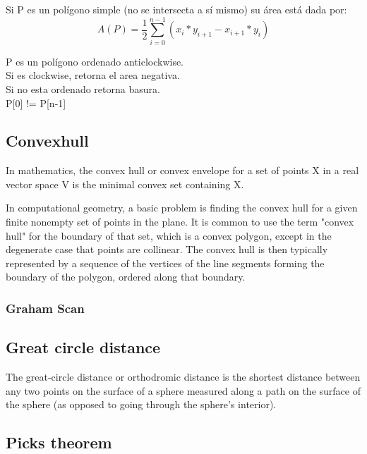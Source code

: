\documentclass[10pt,letterpaper,twocolumn,twosided]{article}
\newcommand{\codigofuente}[1]{

\dotfill
}
\begin{document}
Si P es un polígono simple (no se intersecta a sí mismo) su área está dada
por:\\

$$ A(P) = \frac{1}{2} \sum_{i=0}^{n-1} (x_i*y_{i+1}-x_{i+1}*y_i)$$

P es un polígono ordenado anticlockwise.\\
Si es clockwise, retorna el area negativa.\\ 
Si no esta ordenado retorna basura.\\
P[0] != P[n-1]

\codigofuente{src/geom/areapoligono.cpp}

\subsection{Convexhull}

In mathematics, the convex hull or convex envelope for a set of points X in a real vector space V is the minimal convex set containing X.


In computational geometry, a basic problem is finding the convex hull for a given finite nonempty set of points in the plane. It is common to use the term "convex hull" for the boundary of that set, which is a convex polygon, except in the degenerate case that points are collinear. The convex hull is then typically represented by a sequence of the vertices of the line segments forming the boundary of the polygon, ordered along that boundary.

\subsubsection{Graham Scan}

\codigofuente{src/geom/convexhull.cpp}

\subsection{Great circle distance}

The great-circle distance or orthodromic distance is the shortest distance between any two points on the surface of a sphere measured along a path on the surface of the sphere (as opposed to going through the sphere's interior).

\codigofuente{src/geom/circledistance.cpp}

\subsection{Picks theorem}
\end{document}

